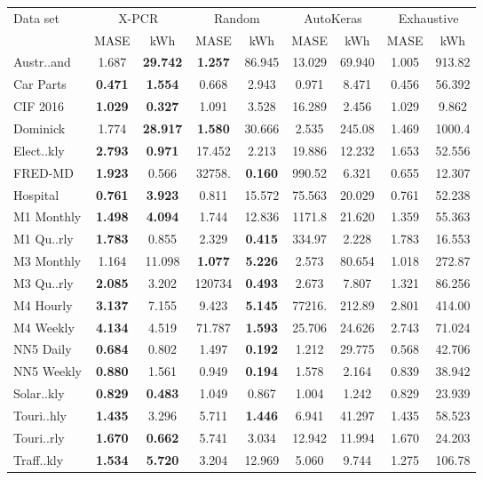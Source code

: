 
    \begin{tabular}{l|cc|cc|cc||cc}
        \toprule 
        Data set & \multicolumn{2}{c}{X-PCR} & \multicolumn{2}{c}{Random} & \multicolumn{2}{c}{AutoKeras} & \multicolumn{2}{c}{Exhaustive} \\
          & MASE & kWh & MASE & kWh & MASE & kWh & MASE & kWh \\
        \midrule
        Austr..and &  1.687 & \textbf{29.742} & \textbf{ 1.257} & 86.945 & 13.029 & 69.940 &  1.005 & 913.82 \\
        Car Parts & \textbf{ 0.471} & \textbf{ 1.554} &  0.668 &  2.943 &  0.971 &  8.471 &  0.456 & 56.392 \\
        CIF 2016 & \textbf{ 1.029} & \textbf{ 0.327} &  1.091 &  3.528 & 16.289 &  2.456 &  1.029 &  9.862 \\
        Dominick &  1.774 & \textbf{28.917} & \textbf{ 1.580} & 30.666 &  2.535 & 245.08 &  1.469 & 1000.4 \\
        Elect..kly & \textbf{ 2.793} & \textbf{ 0.971} & 17.452 &  2.213 & 19.886 & 12.232 &  1.653 & 52.556 \\
        FRED-MD & \textbf{ 1.923} &  0.566 & 32758. & \textbf{ 0.160} & 990.52 &  6.321 &  0.655 & 12.307 \\
        Hospital & \textbf{ 0.761} & \textbf{ 3.923} &  0.811 & 15.572 & 75.563 & 20.029 &  0.761 & 52.238 \\
        M1 Monthly & \textbf{ 1.498} & \textbf{ 4.094} &  1.744 & 12.836 & 1171.8 & 21.620 &  1.359 & 55.363 \\
        M1 Qu..rly & \textbf{ 1.783} &  0.855 &  2.329 & \textbf{ 0.415} & 334.97 &  2.228 &  1.783 & 16.553 \\
        M3 Monthly &  1.164 & 11.098 & \textbf{ 1.077} & \textbf{ 5.226} &  2.573 & 80.654 &  1.018 & 272.87 \\
        M3 Qu..rly & \textbf{ 2.085} &  3.202 & 120734 & \textbf{ 0.493} &  2.673 &  7.807 &  1.321 & 86.256 \\
        M4 Hourly & \textbf{ 3.137} &  7.155 &  9.423 & \textbf{ 5.145} & 77216. & 212.89 &  2.801 & 414.00 \\
        M4 Weekly & \textbf{ 4.134} &  4.519 & 71.787 & \textbf{ 1.593} & 25.706 & 24.626 &  2.743 & 71.024 \\
        NN5 Daily & \textbf{ 0.684} &  0.802 &  1.497 & \textbf{ 0.192} &  1.212 & 29.775 &  0.568 & 42.706 \\
        NN5 Weekly & \textbf{ 0.880} &  1.561 &  0.949 & \textbf{ 0.194} &  1.578 &  2.164 &  0.839 & 38.942 \\
        Solar..kly & \textbf{ 0.829} & \textbf{ 0.483} &  1.049 &  0.867 &  1.004 &  1.242 &  0.829 & 23.939 \\
        Touri..hly & \textbf{ 1.435} &  3.296 &  5.711 & \textbf{ 1.446} &  6.941 & 41.297 &  1.435 & 58.523 \\
        Touri..rly & \textbf{ 1.670} & \textbf{ 0.662} &  5.741 &  3.034 & 12.942 & 11.994 &  1.670 & 24.203 \\
        Traff..kly & \textbf{ 1.534} & \textbf{ 5.720} &  3.204 & 12.969 &  5.060 &  9.744 &  1.275 & 106.78 \\
        \bottomrule
    \end{tabular}
